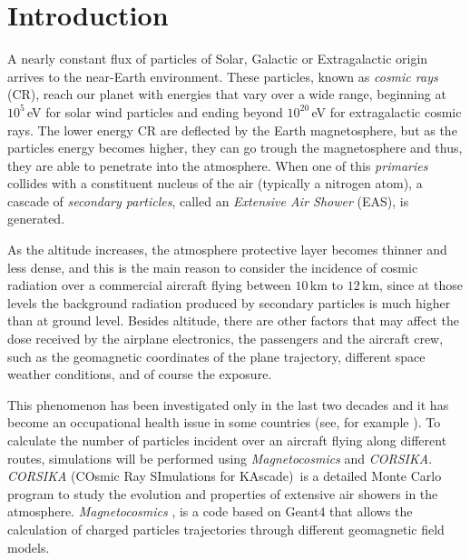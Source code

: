 \documentclass[3p,times,twocolumn]{elsarticle}
\begin{document}
\linenumbers

\section{Introduction}\label{sec:introduction}

A nearly constant flux of particles of Solar, Galactic or Extragalactic origin
arrives to the near-Earth environment. These particles, known as \textit{cosmic
rays} (CR), reach our planet with energies that vary over a wide range,
beginning at $10^5$\,eV for solar wind particles and ending beyond
$10^{20}$\,eV for extragalactic cosmic rays. The lower energy CR are deflected
by the Earth magnetosphere, but as the particles energy becomes higher, they
can go trough the magnetosphere and thus, they are able to penetrate into the
atmosphere. When one of this \textit{primaries} collides with a constituent
nucleus of the air (typically a nitrogen atom), a cascade of \textit{secondary
particles}, called an \textit{Extensive Air Shower} (EAS), is generated. 

As the altitude increases, the atmosphere protective layer becomes thinner and
less dense, and this is the main reason to consider the incidence of cosmic
radiation over a commercial aircraft flying between $10$\,km to $12$\,km, since
at those levels the background radiation produced by secondary particles is
much higher than at ground level. Besides altitude, there are other factors
that may affect the dose received by the airplane electronics, the passengers
and the aircraft crew, such as the geomagnetic coordinates of the plane
trajectory, different space weather conditions, and of course the exposure.

This phenomenon has been investigated only in the last two decades and it has
become an occupational health issue in some countries (see, for example
\cite{bottollier-depois_comparison_2012}). To calculate the number of particles
incident over an aircraft flying along different routes, simulations will be
performed using \textit{Magnetocosmics} and \textit{CORSIKA}. \textit{CORSIKA}
(COsmic Ray SImulations for KAscade)\,\cite{heck_corsika:_1998} is a detailed
Monte Carlo program to study the evolution and properties of extensive air
showers in the atmosphere. \textit{Magnetocosmics}
\cite{Desorgher2003}, is a code based on Geant4
\cite{Pia2003,Allison2006} that allows the calculation of
charged particles trajectories through different geomagnetic field models.
\end{document}
